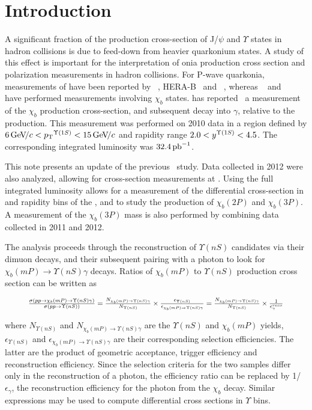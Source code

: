 \section{Introduction}
\label{sec:introduction}

A significant fraction of the production cross-section of J/$\psi$ and
$\Upsilon$ states in hadron collisions is due to feed-down from heavier
quarkonium states. A study of this effect is important for the interpretation of
onia production cross section and polarization measurements in hadron
collisions. For P-wave quarkonia, measurements of \chic have been reported by
\cdf~\cite{Abulencia:2007bra}, HERA-B~\cite{Abt:2008ed}
and \lhcb~\cite{LHCb-PAPER-2011-019}, whereas \cdf~\cite{Affolder:1999wm} and 
\atlas~\cite{Aad:2011ih} have performed measurements involving $\chi_b$ states.
\lhcb has reported~\cite{LHCb-PAPER-2012-015} a measurement of
the $\chi_b$ production cross-section, and subsequent decay into \OneS $\gamma$,
relative to the \OneS production. This measurement was performed on 2010 data
in a region defined by $6 \gevc < \pt^{\Y1S} < 15 \gevc$ and rapidity range
$2.0 < y^{\Y1S} < 4.5$.
The corresponding integrated luminosity was $32.4\mbox{\,pb}^{-1}$.

This note presents an update of the previous \lhcb\ study. Data collected in
2012 were also analyzed, allowing for cross-section measurements at \tev.
Using the full integrated luminosity allows for a measurement of the
differential cross-section in \pt and rapidity bins of the \OneS, and to study
the production of $\chi_b(2P)$ and $\chi_b(3P)$. A measurement of the
$\chi_b(3P)$ mass is also performed by combining data collected in 2011 and
2012.

The analysis proceeds through the reconstruction of $\Upsilon(nS)$ candidates
via their dimuon decays, and their subsequent pairing with a photon to look for
$\chi_b(mP) \to \Upsilon(nS) \gamma$ decays. Ratios of $\chi_b(mP)$ to
$\Upsilon(nS)$ production cross section can be written as

\begin{equation}
\resizebox{.9\hsize}{!}{
$
\frac{\sigma(pp \to \chi_b (mP) \to \Upsilon(nS) \gamma)}{\sigma(pp \to \Upsilon(nS))} =
\frac{N_{\chi_b (mP)\to \Upsilon(nS) \gamma}}{N_{\Upsilon(nS)}} \times \frac{\epsilon_{\Upsilon(nS)}}{\epsilon_{\chi_b (mP)\to \Upsilon(nS) \gamma}} =
\frac{N_{\chi_b (mP)\to \Upsilon(nS) \gamma}}{N_{\Upsilon(nS)}} \times \frac{1}{\epsilon^{reco}_{\gamma}}
$
}
\label{eqn:master}
\end{equation}


\noindent where
${N_{\Upsilon(nS)}}$ and ${N_{\chi_b(mP)\to \Upsilon(nS) \gamma}}$ are the
$\Upsilon(nS)$ and $\chi_b(mP)$ yields, $\epsilon_{\Upsilon(nS)}$ and
$\epsilon_{\chi_b(mP)\to \Upsilon(nS) \gamma}$ are their corresponding selection
efficiencies. The latter are the product of geometric acceptance, trigger
efficiency and reconstruction efficiency. Since the selection criteria for the
two samples differ only in the reconstruction of a photon, the efficiency ratio
can be replaced by 1/$\epsilon_{\gamma}$, the reconstruction efficiency for the
photon from the $\chi_b$ decay. Similar expressions may be used to compute
differential cross sections in $\Upsilon$ \pt bins.